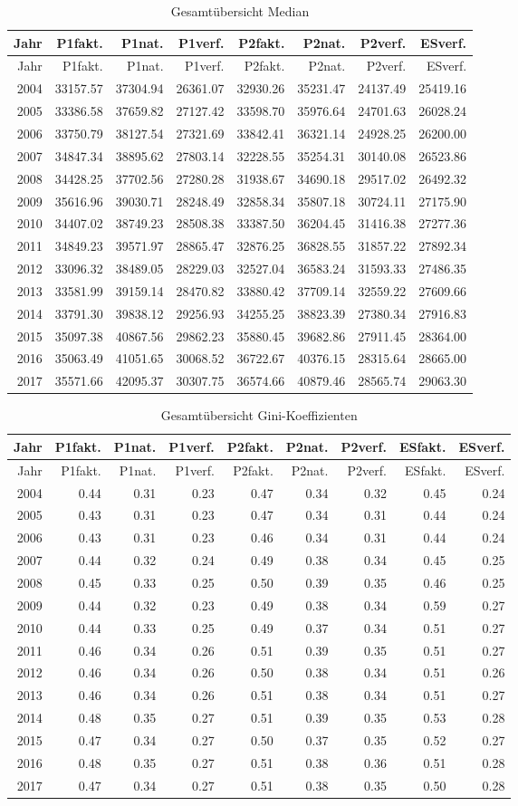 \documentclass[12pt,]{article}
\begin{document}
\begin{longtable}[]{@{}rrrrrrrr@{}}
\caption{Gesamtübersicht Median}\tabularnewline
\toprule
Jahr & P1fakt. & P1nat. & P1verf. & P2fakt. & P2nat. & P2verf. &
ESverf.\tabularnewline
\midrule
\endfirsthead
\toprule
Jahr & P1fakt. & P1nat. & P1verf. & P2fakt. & P2nat. & P2verf. &
ESverf.\tabularnewline
\midrule
\endhead
2004 & 33157.57 & 37304.94 & 26361.07 & 32930.26 & 35231.47 & 24137.49 &
25419.16\tabularnewline
2005 & 33386.58 & 37659.82 & 27127.42 & 33598.70 & 35976.64 & 24701.63 &
26028.24\tabularnewline
2006 & 33750.79 & 38127.54 & 27321.69 & 33842.41 & 36321.14 & 24928.25 &
26200.00\tabularnewline
2007 & 34847.34 & 38895.62 & 27803.14 & 32228.55 & 35254.31 & 30140.08 &
26523.86\tabularnewline
2008 & 34428.25 & 37702.56 & 27280.28 & 31938.67 & 34690.18 & 29517.02 &
26492.32\tabularnewline
2009 & 35616.96 & 39030.71 & 28248.49 & 32858.34 & 35807.18 & 30724.11 &
27175.90\tabularnewline
2010 & 34407.02 & 38749.23 & 28508.38 & 33387.50 & 36204.45 & 31416.38 &
27277.36\tabularnewline
2011 & 34849.23 & 39571.97 & 28865.47 & 32876.25 & 36828.55 & 31857.22 &
27892.34\tabularnewline
2012 & 33096.32 & 38489.05 & 28229.03 & 32527.04 & 36583.24 & 31593.33 &
27486.35\tabularnewline
2013 & 33581.99 & 39159.14 & 28470.82 & 33880.42 & 37709.14 & 32559.22 &
27609.66\tabularnewline
2014 & 33791.30 & 39838.12 & 29256.93 & 34255.25 & 38823.39 & 27380.34 &
27916.83\tabularnewline
2015 & 35097.38 & 40867.56 & 29862.23 & 35880.45 & 39682.86 & 27911.45 &
28364.00\tabularnewline
2016 & 35063.49 & 41051.65 & 30068.52 & 36722.67 & 40376.15 & 28315.64 &
28665.00\tabularnewline
2017 & 35571.66 & 42095.37 & 30307.75 & 36574.66 & 40879.46 & 28565.74 &
29063.30\tabularnewline
\bottomrule
\end{longtable}

\begin{longtable}[]{@{}rrrrrrrrr@{}}
\caption{Gesamtübersicht Gini-Koeffizienten}\tabularnewline
\toprule
Jahr & P1fakt. & P1nat. & P1verf. & P2fakt. & P2nat. & P2verf. & ESfakt.
& ESverf.\tabularnewline
\midrule
\endfirsthead
\toprule
Jahr & P1fakt. & P1nat. & P1verf. & P2fakt. & P2nat. & P2verf. & ESfakt.
& ESverf.\tabularnewline
\midrule
\endhead
2004 & 0.44 & 0.31 & 0.23 & 0.47 & 0.34 & 0.32 & 0.45 &
0.24\tabularnewline
2005 & 0.43 & 0.31 & 0.23 & 0.47 & 0.34 & 0.31 & 0.44 &
0.24\tabularnewline
2006 & 0.43 & 0.31 & 0.23 & 0.46 & 0.34 & 0.31 & 0.44 &
0.24\tabularnewline
2007 & 0.44 & 0.32 & 0.24 & 0.49 & 0.38 & 0.34 & 0.45 &
0.25\tabularnewline
2008 & 0.45 & 0.33 & 0.25 & 0.50 & 0.39 & 0.35 & 0.46 &
0.25\tabularnewline
2009 & 0.44 & 0.32 & 0.23 & 0.49 & 0.38 & 0.34 & 0.59 &
0.27\tabularnewline
2010 & 0.44 & 0.33 & 0.25 & 0.49 & 0.37 & 0.34 & 0.51 &
0.27\tabularnewline
2011 & 0.46 & 0.34 & 0.26 & 0.51 & 0.39 & 0.35 & 0.51 &
0.27\tabularnewline
2012 & 0.46 & 0.34 & 0.26 & 0.50 & 0.38 & 0.34 & 0.51 &
0.26\tabularnewline
2013 & 0.46 & 0.34 & 0.26 & 0.51 & 0.38 & 0.34 & 0.51 &
0.27\tabularnewline
2014 & 0.48 & 0.35 & 0.27 & 0.51 & 0.39 & 0.35 & 0.53 &
0.28\tabularnewline
2015 & 0.47 & 0.34 & 0.27 & 0.50 & 0.37 & 0.35 & 0.52 &
0.27\tabularnewline
2016 & 0.48 & 0.35 & 0.27 & 0.51 & 0.38 & 0.36 & 0.51 &
0.28\tabularnewline
2017 & 0.47 & 0.34 & 0.27 & 0.51 & 0.38 & 0.35 & 0.50 &
0.28\tabularnewline
\bottomrule
\end{longtable}
\end{document}
